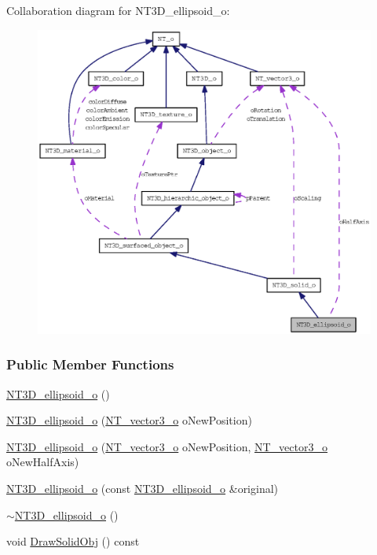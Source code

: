 Collaboration diagram for NT3D\_\-ellipsoid\_\-o:
\nopagebreak
\begin{figure}[H]
\begin{center}
\leavevmode
\includegraphics[width=400pt]{class_n_t3_d__ellipsoid__o__coll__graph}
\end{center}
\end{figure}
\subsubsection*{Public Member Functions}
\begin{DoxyCompactItemize}
\item 
\hyperlink{class_n_t3_d__ellipsoid__o_a1272c86942a1fd45f8e5c48c6acc5f28}{NT3D\_\-ellipsoid\_\-o} ()
\item 
\hyperlink{class_n_t3_d__ellipsoid__o_abda4e2d7b73c76de454a961d98d77ff3}{NT3D\_\-ellipsoid\_\-o} (\hyperlink{class_n_t__vector3__o}{NT\_\-vector3\_\-o} oNewPosition)
\item 
\hyperlink{class_n_t3_d__ellipsoid__o_a55cccc77b42aa944f95954651e77ece0}{NT3D\_\-ellipsoid\_\-o} (\hyperlink{class_n_t__vector3__o}{NT\_\-vector3\_\-o} oNewPosition, \hyperlink{class_n_t__vector3__o}{NT\_\-vector3\_\-o} oNewHalfAxis)
\item 
\hyperlink{class_n_t3_d__ellipsoid__o_a3696143926c80e9be82f1c59e68ea20f}{NT3D\_\-ellipsoid\_\-o} (const \hyperlink{class_n_t3_d__ellipsoid__o}{NT3D\_\-ellipsoid\_\-o} \&original)
\item 
\hyperlink{class_n_t3_d__ellipsoid__o_ad002301bb68dc527c625f9d72738fe6b}{$\sim$NT3D\_\-ellipsoid\_\-o} ()
\item 
void \hyperlink{class_n_t3_d__ellipsoid__o_a3ff3950a1ec380baabe84b3f4ced0a56}{DrawSolidObj} () const 
\end{DoxyCompactItemize}


